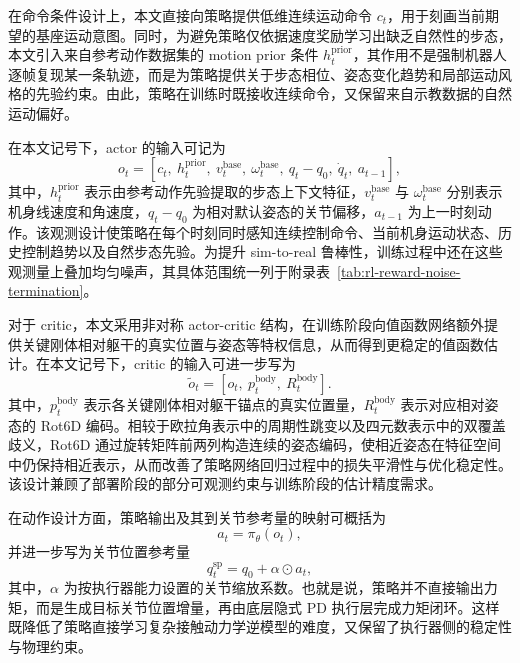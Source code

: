 在命令条件设计上，本文直接向策略提供低维连续运动命令 $c_t$，用于刻画当前期望的基座运动意图。同时，为避免策略仅依据速度奖励学习出缺乏自然性的步态，本文引入来自参考动作数据集的 motion prior 条件 $h_t^{\mathrm{prior}}$，其作用不是强制机器人逐帧复现某一条轨迹，而是为策略提供关于步态相位、姿态变化趋势和局部运动风格的先验约束。由此，策略在训练时既接收连续命令，又保留来自示教数据的自然运动偏好。

在本文记号下，actor 的输入可记为
\begin{equation}
o_t = \left[c_t,\ h_t^{\mathrm{prior}},\ v^{\text{base}}_t,\ \omega^{\text{base}}_t,\ q_t-q_0,\ \dot{q}_t,\ a_{t-1}\right],
\end{equation}
其中，$h_t^{\mathrm{prior}}$ 表示由参考动作先验提取的步态上下文特征，$v^{\text{base}}_t$ 与 $\omega^{\text{base}}_t$ 分别表示机身线速度和角速度，$q_t-q_0$ 为相对默认姿态的关节偏移，$a_{t-1}$ 为上一时刻动作。该观测设计使策略在每个时刻同时感知连续控制命令、当前机身运动状态、历史控制趋势以及自然步态先验。为提升 sim-to-real 鲁棒性，训练过程中还在这些观测量上叠加均匀噪声，其具体范围统一列于附录表~\ref{tab:rl-reward-noise-termination}。

对于 critic，本文采用非对称 actor-critic 结构，在训练阶段向值函数网络额外提供关键刚体相对躯干的真实位置与姿态等特权信息，从而得到更稳定的值函数估计。在本文记号下，critic 的输入可进一步写为
\begin{equation}
\tilde{o}_t = \left[o_t,\ p^{\text{body}}_t,\ R^{\text{body}}_t\right].
\end{equation}
其中，$p^{\text{body}}_t$ 表示各关键刚体相对躯干锚点的真实位置量，$R^{\text{body}}_t$ 表示对应相对姿态的 Rot6D 编码。相较于欧拉角表示中的周期性跳变以及四元数表示中的双覆盖歧义，Rot6D 通过旋转矩阵前两列构造连续的姿态编码，使相近姿态在特征空间中仍保持相近表示，从而改善了策略网络回归过程中的损失平滑性与优化稳定性。该设计兼顾了部署阶段的部分可观测约束与训练阶段的估计精度需求。

在动作设计方面，策略输出及其到关节参考量的映射可概括为
\begin{equation}
a_t = \pi_{\theta}(o_t),
\end{equation}
并进一步写为关节位置参考量
\begin{equation}
q_t^{\text{sp}} = q_0 + \alpha \odot a_t,
\end{equation}
其中，$\alpha$ 为按执行器能力设置的关节缩放系数。也就是说，策略并不直接输出力矩，而是生成目标关节位置增量，再由底层隐式 PD 执行层完成力矩闭环。这样既降低了策略直接学习复杂接触动力学逆模型的难度，又保留了执行器侧的稳定性与物理约束。


